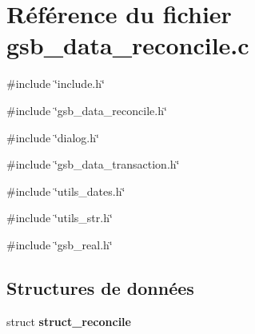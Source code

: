 \section{Référence du fichier gsb\_\-data\_\-reconcile.c}
\label{gsb__data__reconcile_8c}
{\ttfamily \#include \char`\"{}include.h\char`\"{}}\par
{\ttfamily \#include \char`\"{}gsb\_\-data\_\-reconcile.h\char`\"{}}\par
{\ttfamily \#include \char`\"{}dialog.h\char`\"{}}\par
{\ttfamily \#include \char`\"{}gsb\_\-data\_\-transaction.h\char`\"{}}\par
{\ttfamily \#include \char`\"{}utils\_\-dates.h\char`\"{}}\par
{\ttfamily \#include \char`\"{}utils\_\-str.h\char`\"{}}\par
{\ttfamily \#include \char`\"{}gsb\_\-real.h\char`\"{}}\par
\subsection*{Structures de données}
\begin{DoxyCompactItemize}
\item 
struct {\bf struct\_\-reconcile}
\end{DoxyCompactItemize}
